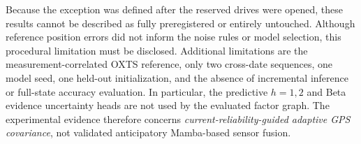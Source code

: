 Because the exception was defined after the
reserved drives were opened, these results
cannot be described as fully preregistered or
entirely untouched. Although reference
position errors did not inform the noise rules
or model selection, this procedural limitation
must be disclosed. Additional limitations are
the measurement-correlated OXTS reference,
only two cross-date sequences, one model seed,
one held-out initialization, and the absence
of incremental inference or full-state accuracy
evaluation. In particular, the predictive
$h=1,2$ and Beta evidence uncertainty heads
are not used by the evaluated factor graph.
The experimental evidence therefore concerns
\emph{current-reliability-guided adaptive GPS
covariance}, not validated anticipatory
Mamba-based sensor fusion.
